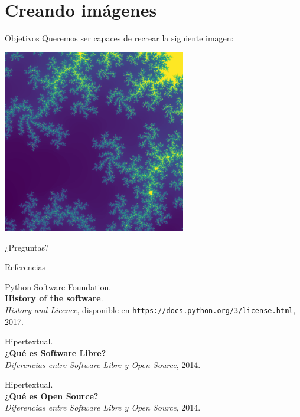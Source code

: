 \documentclass[usenames,dvipsnames]{beamer}
\begin{document}
  \section{Creando imágenes}
  \begin{frame}{Objetivos}
    Queremos ser capaces de recrear la siguiente imagen:
    \begin{center}
      \includegraphics[width=0.6\textwidth]{imgs/mandel}\hspace{0.5cm}
    \end{center}
  \end{frame}

  \begin{frame}[standout]
    ¿Preguntas?
  \end{frame}

  \begin{frame}{Referencias}
    \begin{enumerate}[{[}1{]}]
      \item Python Software Foundation.\\
      \textbf{History of the software}.\\
      \textit{History and Licence},
      disponible en \texttt{https://docs.python.org/3/license.html}, 2017.

      \item Hipertextual.\\
      \textbf{¿Qué es Software Libre?}\\
      \textit{Diferencias entre Software Libre y Open Source}, 2014.

      \item Hipertextual.\\
      \textbf{¿Qué es Open Source?}\\
      \textit{Diferencias entre Software Libre y Open Source}, 2014.
    \end{enumerate}
  \end{frame}
\end{document}
